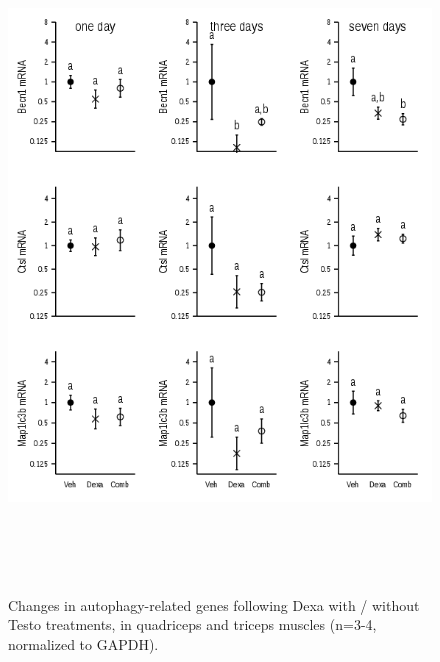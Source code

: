 \documentclass[12pt,english]{report}\usepackage[]{graphicx}\usepackage[]{color}
\newenvironment{knitrout}{}{} %
\begin{document}
\begin{figure}
\begin{knitrout}
\color{fgcolor}
\includegraphics[width=6in,height=7in]{figure/gastrocnemiusautophagy-1} 

\end{knitrout}

\protect\caption[Changes in autophagy-related genes following Dexa with / without Testo
treatments.]{Changes in autophagy-related genes following Dexa with / without
Testo treatments, in quadriceps and triceps muscles (n=3-4, normalized
to GAPDH).\label{fig:Autophagy-related-genes}}
\end{figure}
\end{document}

